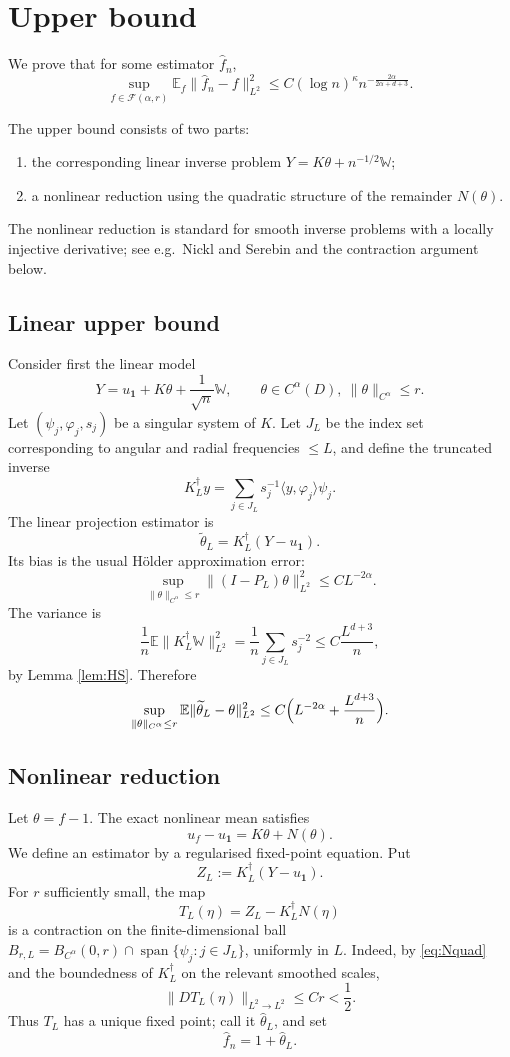 \documentclass[11pt]{article}
\newcommand{\E}{\mathbb{E}}
\newcommand{\1}{\mathbf{1}}
\begin{document}
\section{Upper bound}

We prove that for some estimator $\widehat f_n$,
\[
\sup_{f\in\mathcal F(\alpha,r)}
\E_f\|\widehat f_n-f\|_{L^2}^2
\le
C(\log n)^\kappa n^{-\frac{2\alpha}{2\alpha+d+3}}.
\]

The upper bound consists of two parts:
\begin{enumerate}[label=(\alph*)]
\item the corresponding linear inverse problem $Y=K\theta+n^{-1/2}\mathbb W$;
\item a nonlinear reduction using the quadratic structure of the remainder $N(\theta)$.
\end{enumerate}
The nonlinear reduction is standard for smooth inverse problems with a locally injective derivative; see e.g.\ Nickl and Serebin \cite{NS} and the contraction argument below.

\subsection{Linear upper bound}

Consider first the linear model
\[
Y=u_{\1}+K\theta+\frac1{\sqrt n}\mathbb W,
\qquad
\theta\in C^\alpha(D),\ \|\theta\|_{C^\alpha}\le r.
\]
Let $(\psi_j,\varphi_j,s_j)$ be a singular system of $K$. Let $J_L$ be the index set corresponding to angular and radial frequencies $\le L$, and define the truncated inverse
\[
K_L^\dagger y
=
\sum_{j\in J_L}s_j^{-1}\langle y,\varphi_j\rangle\psi_j.
\]
The linear projection estimator is
\[
\widetilde\theta_L
=
K_L^\dagger(Y-u_{\1}).
\]
Its bias is the usual Hölder approximation error:
\[
\sup_{\|\theta\|_{C^\alpha}\le r}
\|(I-P_L)\theta\|_{L^2}^2
\le
C L^{-2\alpha}.
\]
The variance is
\[
\frac1n\E\|K_L^\dagger\mathbb W\|_{L^2}^2
=
\frac1n\sum_{j\in J_L}s_j^{-2}
\le
C\frac{L^{d+3}}n,
\]
by Lemma \ref{lem:HS}. Therefore
\begin{equation}\label{eq:linearupper}
\sup_{\|\theta\|_{C^\alpha}\le r}
\E\|\widetilde\theta_L-\theta\|_{L^2}^2
\le
C\Bigl(L^{-2\alpha}+\frac{L^{d+3}}n\Bigr).
\end{equation}

\subsection{Nonlinear reduction}

Let $\theta=f-1$. The exact nonlinear mean satisfies
\[
u_f-u_{\1}=K\theta+N(\theta).
\]
We define an estimator by a regularised fixed-point equation. Put
\[
Z_L:=K_L^\dagger(Y-u_{\1}).
\]
For $r$ sufficiently small, the map
\[
T_L(\eta)
=
Z_L-K_L^\dagger N(\eta)
\]
is a contraction on the finite-dimensional ball $B_{r,L}=B_{C^\alpha}(0,r)\cap \operatorname{span}\{\psi_j:j\in J_L\}$, uniformly in $L$. Indeed, by \eqref{eq:Nquad} and the boundedness of $K_L^\dagger$ on the relevant smoothed scales,
\[
\|DT_L(\eta)\|_{L^2\to L^2}
\le
C r
<
\frac12.
\]
Thus $T_L$ has a unique fixed point; call it $\widehat\theta_L$, and set
\[
\widehat f_n=1+\widehat\theta_L.
\]
\end{document}
